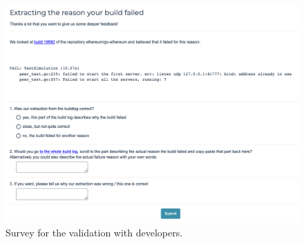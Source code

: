 \documentclass[\myrootdir/main.tex]{subfiles}
\begin{document}
\begin{figure}[h]
	\centering
	\includegraphics[width=\textwidth, clip]{img/dev-survey.png}
	\caption{Survey for the validation with developers.}
	\label{fig:dev-survey}
\end{figure}
\end{document}
